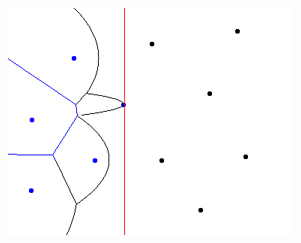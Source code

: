\begin{figure}[H]
\begin{center}
\begin{minipage}[h]{0.3\linewidth}
            \includegraphics[width=1\linewidth]{fortunes-algo-05.jpg}
        \end{minipage}
    \end{center}
\end{figure}

